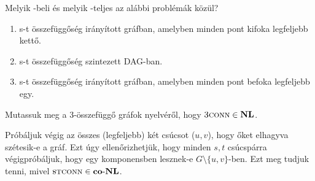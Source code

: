 

\begin{Exercise}[counter={sorszam}, difficulty=0]
	Melyik \LOGSPACE-beli és melyik \NL-teljes az alábbi problémák közül?
	\begin{enumerate}
		\item s-t összefüggőség irányított gráfban, amelyben minden pont kifoka legfeljebb kettő.
		\item s-t összefüggőség szintezett DAG-ban. 
		\item s-t összefüggőség irányított gráfban, amelyben minden pont befoka legfeljebb egy.
	\end{enumerate}
\end{Exercise}




\begin{Exercise}[counter={sorszam}, difficulty=0]
	Mutassuk meg a $3$-\"osszef\"ugg\H o gr\'afok nyelv\'er\H ol, hogy $\la{3conn} \in \NL$.
\end{Exercise}	
\begin{Answer}
	Pr\'ob\'aljuk v\'egig az \"osszes (legfeljebb) k\'et cs\'ucsot ($u,v$), hogy \H oket elhagyva sz\'etesik-e a gr\'af.
	Ezt \'ugy ellen\H orizhetj\"uk, hogy minden $s,t$ cs\'ucsp\'arra v\'egigpr\'ob\'aljuk, hogy egy komponensben lesznek-e $G\setminus\{u,v\}$-ben.
	Ezt meg tudjuk tenni, mivel $\la{STconn}\in \coNL$.
\end{Answer} 

